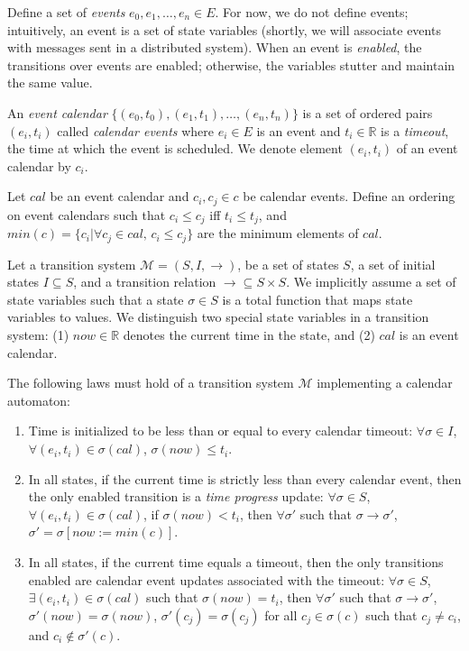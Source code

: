 \documentclass{llncs/llncs}
\begin{document}
Define a set of \emph{events} $e_0, e_1, \ldots, e_n \in E$. For now, we do not define events; intuitively, an event is a set of state variables (shortly, we will associate events with messages sent in a distributed system). When an event is \emph{enabled}, the transitions over events are enabled; otherwise, the variables stutter and maintain the same value.

An \emph{event calendar} $\{ (e_0, t_0), (e_1, t_1), \ldots, (e_n, t_n) \}$ is a set of ordered pairs $(e_i, t_i)$ called \emph{calendar events} where $e_i \in E$ is an event and $t_i \in \mathbb{R}$ is a \emph{timeout}, the time at which the event is scheduled. We denote element $(e_i, t_i)$ of an event calendar by $c_i$.

Let $cal$ be an event calendar and $c_i, c_j \in c$ be calendar events. Define an ordering on event calendars such that $c_i \leq c_j$ iff $t_i \leq t_j$, and $min(c) = \{ c_i | \forall c_j \in cal, \, c_i \leq c_j  \}$ are the minimum elements of $cal$.

Let a transition system $\mathcal{M} = (S, I, \rightarrow)$, be a set of states $S$, a set of initial states $I \subseteq S$, and a transition relation $\rightarrow \subseteq S \times S$. We implicitly assume a set of state variables such that a state $\sigma \in S$ is a total function that maps state variables to values. We distinguish two special state variables in a transition system: (1) $now \in \mathbb{R}$ denotes the current time in the state, and (2) $cal$ is an event calendar.

The following laws must hold of a transition system $\mathcal{M}$ implementing a calendar automaton:

\begin{enumerate}
\item \label{cal:a} Time is initialized to be less than or equal to every calendar timeout: $\forall \sigma \in I$, $\forall (e_i, t_i) \in \sigma(cal)$, $\sigma(now) \leq t_i$.


\item \label{cal:c} In all states, if the current time is strictly less than every calendar event, then the only enabled transition is a \emph{time progress} update: $\forall \sigma \in S$, $\forall (e_i, t_i) \in \sigma(cal)$, if $\sigma(now) < t_i$, then $\forall \sigma'$ such that $\sigma \rightarrow \sigma'$, $\sigma' = \sigma[now := min(c)]$.

\item \label{cal:d} In all states, if the current time equals a timeout, then the only transitions enabled are calendar event updates associated with the timeout: $\forall \sigma \in S$, $\exists (e_i, t_i) \in \sigma(cal)$ such that $\sigma(now) = t_i$, then $\forall \sigma'$ such that $\sigma \rightarrow \sigma'$, $\sigma'(now) = \sigma(now)$, $\sigma'(c_j) = \sigma(c_j)$ for all $c_j \in \sigma(c)$ such that $c_j \neq c_i$, and $c_i \notin \sigma'(c)$.

\end{enumerate}
\end{document}
